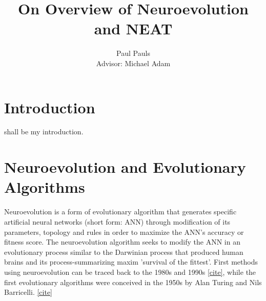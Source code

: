 \documentclass[journal, a4paper]{IEEEtran}
\begin{document}
\title{On Overview of Neuroevolution and NEAT}
\author{Paul Pauls\\
        Advisor: Michael Adam}
\maketitle


\tableofcontents

\begin{abstract}
    \blindtext
\end{abstract}


\section{Introduction}

 shall be my introduction.
\blindtext





\section{Neuroevolution and Evolutionary Algorithms}

Neuroevolution is a form of evolutionary algorithm that generates specific artificial neural networks (short form: ANN) through modification of its parameters, topology and rules in order to maximize the ANN's accuracy or fitness score. The neuroevolution algorithm seeks to modify the ANN in an evolutionary process similar to the Darwinian process that produced human brains and its process-summarizing maxim 'survival of the fittest'. First methods using neuroevolution can be traced back to the 1980s and 1990s \href{https://www.inovex.de/blog/neuroevolution/}{[cite]}, while the first evolutionary algorithms were conceived in the 1950s by Alan Turing and Nils Barricelli. \href{https://en.wikipedia.org/wiki/Genetic_algorithm#cite_note-mind.oxfordjournals.org-33}{[cite]}
\end{document}
